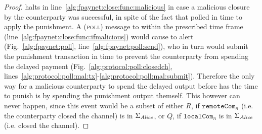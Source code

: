 \begin{proof}
  \fpaynet{} halts in line~\ref{alg:fpaynet:close:func:malicious} in case a
  malicious closure by the counterparty was successful, in spite of the fact
  that \alice{} polled in time to apply the punishment. A (\textsc{poll})
  message to \alice{} within the prescribed time frame
  (line~\ref{alg:fpaynet:close:func:ifmalicious}) would cause \fpaynet{} to
  alert \simulator{} (Fig.~\ref{alg:fpaynet:poll},
  line~\ref{alg:fpaynet:poll:send}), who in turn would submit the punishment
  transaction in time to prevent the counterparty from spending the delayed
  payment (Fig.~\ref{alg:protocol:poll:closedch},
  lines~\ref{alg:protocol:poll:mal:tx}-\ref{alg:protocol:poll:mal:submit}).
  Therefore the only way for a malicious counterparty to spend the delayed
  output before \alice{} has the time to punish is by spending the punishment
  output themself. This however can never happen, since this event would be a
  subset of either $R$, if $\mathtt{remoteCom}_n$ (i.e. the counterparty closed
  the channel) is in $\Sigma_{\mathit{Alice}}$, or $Q$, if $\mathtt{localCom}_n$ is in
  $\Sigma_{\mathit{Alice}}$ (i.e. \alice{} closed the channel).


\end{proof}
